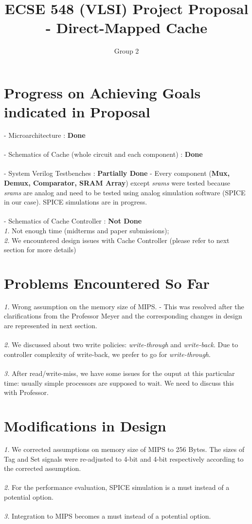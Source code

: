 \documentclass{article}
\begin{document}
\title{ECSE 548 (VLSI) Project Proposal - Direct-Mapped Cache}
\date{}
\author{Group 2}
\maketitle

\section{Progress on Achieving Goals indicated in Proposal}
- Microarchitecture : \textbf{Done} \\ \\
- Schematics of Cache (whole circuit and each component) :  \textbf{Done} \\ \\
- System Verilog Testbenches : \textbf{Partially Done} - Every component (\textbf{Mux, Demux, Comparator, SRAM Array}) except \textit{srams} were tested because \textit{srams} are analog and need to be tested using analog simulation software (SPICE in our case). SPICE simulations are in progress.
 \\ \\
- Schematics of Cache Controller : \textbf{Not Done} \\
	\textit{1.} Not enough time (midterms and paper submissions); \\
	 \textit{2.} We encountered design issues with Cache Controller (please refer to next section for more details)

\section{Problems Encountered So Far}

\textit{1.} Wrong assumption on the memory size of MIPS. - This was resolved after the clarifications from the Professor Meyer and the corresponding changes in design are represented in next section. \\ \\
\textit{2.} We discussed about two write policies: \textit{write-through} and \textit{write-back}. Due to controller complexity of write-back, we prefer to go for \textit{write-through}. \\ \\
\textit{3.} After read/write-miss, we have some issues  for the ouput at this particular time: usually  simple processors are supposed to wait. We need to discuss this with Professor.

\section{Modifications in Design}
\textit{1.} We corrected assumptions on memory size of MIPS to 256 Bytes. The sizes of Tag and Set signals were re-adjusted to 4-bit and 4-bit respectively according to the corrected assumption. \\ \\
\textit{2.} For the performance evaluation, SPICE simulation is a must instead of a potential option. \\ \\
\textit{3.} Integration to MIPS becomes a must instead of a potential option. \\ \\
\end{document}

